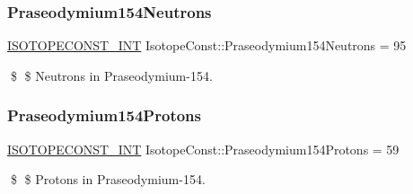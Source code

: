 \subsubsection{\texorpdfstring{Praseodymium154\+Neutrons}{Praseodymium154Neutrons}}
{\footnotesize\ttfamily \mbox{\hyperlink{group___isotope_const-_macros_ga5f18360b3e99483a35c32d789e62621c}{I\+S\+O\+T\+O\+P\+E\+C\+O\+N\+S\+T\+\_\+\+I\+NT}} Isotope\+Const\+::\+Praseodymium154\+Neutrons = 95}

\$ \$ Neutrons in Praseodymium-\/154. \mbox{\label{group___isotope_const-_praseodymium-_pr154_gaede902db6712106a958d8b75bbbd04bb}} 
\subsubsection{\texorpdfstring{Praseodymium154\+Protons}{Praseodymium154Protons}}
{\footnotesize\ttfamily \mbox{\hyperlink{group___isotope_const-_macros_ga5f18360b3e99483a35c32d789e62621c}{I\+S\+O\+T\+O\+P\+E\+C\+O\+N\+S\+T\+\_\+\+I\+NT}} Isotope\+Const\+::\+Praseodymium154\+Protons = 59}

\$ \$ Protons in Praseodymium-\/154. 